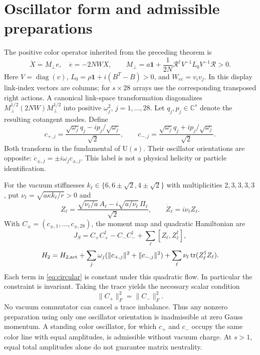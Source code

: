 \documentclass[11pt,a4paper]{article}
\newcommand{\id}{\mathbf1}\newcommand{\tr}{\operatorname{tr}}\newcommand{\diag}{\operatorname{diag}}\newcommand{\Rea}{\operatorname{Re}}
\begin{document}
\section{Oscillator form and admissible preparations}
The positive color operator inherited from the preceding theorem is
\[
\dot X=M_\perp e,\quad \dot e=-2NWX,\qquad
M_\perp=a\id+\frac1{2N}\mathcal R^\dagger V^{-1}L_0V^{-1}\mathcal R>0.
\]
Here $V=\diag(v)$, $L_0=\rho\id+i(B^T-B)>0$, and $W_{ee}=v_iv_j$. In this display link-index vectors are columns; for $s\times28$ arrays use the corresponding transposed right actions. A canonical link-space transformation diagonalizes $M_\perp^{1/2}(2NW)M_\perp^{1/2}$ into positive $\omega_j^2$, $j=1,\ldots,28$. Let $q_j,p_j\in\mathbb C^s$ denote the resulting cotangent modes. Define
\[
c_{+,j}=\frac{\sqrt{\omega_j}q_j-i p_j/\sqrt{\omega_j}}{\sqrt2},\qquad
c_{-,j}=\frac{\sqrt{\omega_j}q_j+i p_j/\sqrt{\omega_j}}{\sqrt2}.
\]
Both transform in the fundamental of $\mathrm U(s)$. Their oscillator orientations are opposite: $\dot c_{\pm,j}=\pm i\omega_jc_{\pm,j}$. This label is not a physical helicity or particle identification.

For the vacuum stiffnesses $k_\ell\in\{6,6\pm\sqrt2,4\pm\sqrt2\}$ with multiplicities $2,3,3,3,3$, put $\nu_\ell=\sqrt{a\kappa k_\ell/r}>0$ and
\[
Z_\ell=\frac{\sqrt{\nu_\ell/a}\,A_\ell-i\sqrt{a/\nu_\ell}\,\Pi_\ell}{\sqrt2},
\qquad \dot Z_\ell=i\nu_\ell Z_\ell.
\]
With $C_\pm=(c_{\pm,1},\ldots,c_{\pm,28})$, the moment map and quadratic Hamiltonian are
\begin{equation}
\boxed{J_S=C_+C_+^\dagger-C_-C_-^\dagger+\sum_\ell[Z_\ell,Z_\ell^\dagger],}\label{eq:circular}
\end{equation}
\[
H_2=H_{2,\rm act}+\sum_j\omega_j(\|c_{+,j}\|^2+\|c_{-,j}\|^2)
+\sum_\ell\nu_\ell\tr(Z_\ell^\dagger Z_\ell).
\]
Each term in \eqref{eq:circular} is constant under this quadratic flow. In particular the constraint is invariant. Taking the trace yields the necessary scalar condition
\begin{equation}
\boxed{\|C_+\|_F^2=\|C_-\|_F^2.}\label{eq:trace}
\end{equation}
No vacuum commutator can cancel a trace imbalance. Thus any nonzero preparation using only one oscillator orientation is inadmissible at zero Gauss momentum. A standing color oscillator, for which $c_+$ and $c_-$ occupy the same color line with equal amplitudes, is admissible without vacuum charge. At $s>1$, equal total amplitudes alone do not guarantee matrix neutrality.

\newpage
\end{document}
